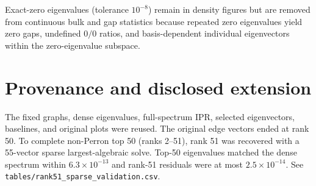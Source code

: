\documentclass[10pt,letterpaper]{article}
\begin{document}
Exact-zero eigenvalues (tolerance $10^{-8}$) remain in density figures but are removed from
continuous bulk and gap statistics because repeated zero eigenvalues yield zero gaps, undefined
$0/0$ ratios, and basis-dependent individual eigenvectors within the zero-eigenvalue subspace.

\section{Provenance and disclosed extension}
The fixed graphs, dense eigenvalues, full-spectrum IPR, selected eigenvectors, baselines, and
original plots were reused. The original edge vectors ended at rank 50. To complete non-Perron
top 50 (ranks 2--51), rank 51 was recovered with a 55-vector sparse largest-algebraic solve.
Top-50 eigenvalues matched the dense spectrum within $6.3\times10^{-13}$ and rank-51 residuals
were at most $2.5\times10^{-14}$. See \texttt{tables/rank51\_sparse\_validation.csv}.
\end{document}
